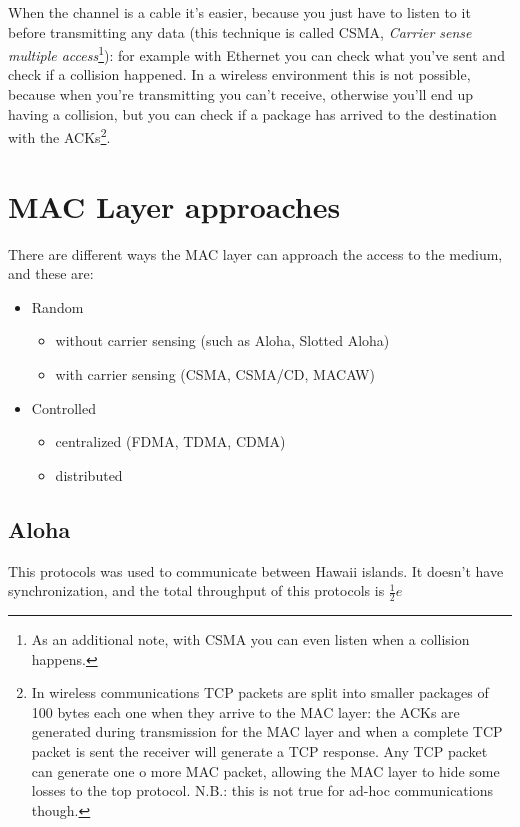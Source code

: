 When the channel is a cable it's easier, because you just have to listen to it
before transmitting any data (this technique is called CSMA, \textit{Carrier
  sense  multiple access}\footnote{As an additional note, with CSMA you can
  even listen  when a collision happens.}): for example with Ethernet you can
check what you've sent and check if a collision happened. In a wireless
environment this is not possible, because when you're transmitting you can't
receive, otherwise you'll end up having a collision, but you can check if a
package has arrived to the destination with the ACKs\footnote{
  In wireless communications TCP packets are split into smaller packages of 100
  bytes each one when they arrive to the MAC layer: the ACKs are generated
  during transmission for the MAC layer and when a complete TCP packet is sent
  the receiver will generate a TCP response. Any TCP packet can generate one o
  more MAC packet, allowing the MAC layer to hide some losses to the top
  protocol. N.B.: this is not true for ad-hoc communications though.
}.

\section{MAC Layer approaches}

There are different ways the MAC layer can approach the access to the medium,
and these are:
\begin{itemize}
\item Random
  \begin{itemize}
  \item without carrier sensing (such as Aloha, Slotted Aloha)
  \item with carrier sensing (CSMA, CSMA/CD, MACAW)
  \end{itemize}
\item Controlled
  \begin{itemize}
  \item centralized (FDMA, TDMA, CDMA)
  \item distributed
  \end{itemize}
\end{itemize}

\subsection{Aloha}

This protocols was used to communicate between Hawaii islands. It doesn't have
synchronization, and the total throughput of this protocols is $\frac{1}{2}e$

